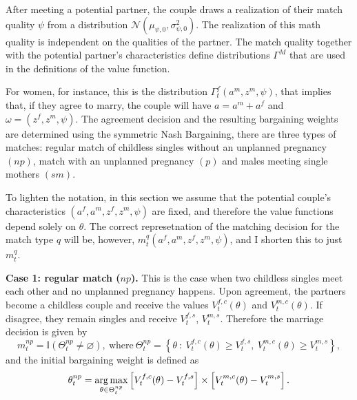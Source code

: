 \documentclass[12pt,letter]{article}
\DeclareMathOperator*{\argmax}{\mathrm{arg\,max}}
\newcommand{\I}{\mathbb{I}}
\begin{document}
After meeting a potential partner, the couple draws a realization of their match quality $\psi$ from a distribution $\mathcal{N}(\mu_{\psi,0},\sigma^2_{\psi,0})$.  The realization of this math quality is independent on the qualities of the partner. The match quality together with the potential partner's characteristics define distributions $\Gamma^M$ that are used in the definitions of the value function. 

For women, for instance, this is the distribution $\Gamma^f_t(a^m,z^m,\psi)$, that implies that, if they agree to marry, the couple will have $a = a^m + a^f$ and $\omega = (z^f,z^m,\psi)$. The agreement decision and the resulting bargaining weights are determined using the symmetric Nash Bargaining, there are three types of matches: regular match of childless singles without an unplanned pregnancy $(np)$, match with an unplanned pregnancy $(p)$ and males meeting single mothers $(sm)$. 

To lighten the notation, in this section we assume that the potential couple's characteristics $(a^f,a^m,z^f,z^m,\psi)$ are fixed, and therefore the value functions depend solely on $\theta$. The correct represetnation of the matching decision for the match type $q$ will be, however, $m_t^q(a^f,a^m,z^f,z^m,\psi)$, and I shorten this to just $m^q_t$.

\textbf{Case 1: regular match ($np$).} This is the case when two childless singles meet each other and no unplanned pregnancy happens. Upon agreement, the partners become a childless couple and receive the values $V_t^{f,c}(\theta)$ and $V_t^{m,c}(\theta)$. If disagree, they remain singles and receive $V_t^{f,s}$, $V_t^{m,s}$. Therefore the marriage decision is given by
\[m^{np}_t = \I(\Theta^{np}_t \neq \varnothing), \ \text{where} \ \Theta^{np}_t = \left\{ \theta \ : \ V_t^{f,c}(\theta) \geq V_t^{f,s}, \ V_t^{m,c}(\theta) \geq V_t^{m,s} \right\},\]
and the initial bargaining weight is defined as
\begin{equation}\label{bargaining-problem-regular}\theta^{np}_t = \argmax\limits_{\theta\in \Theta^{np}_t} \left[ V_t^{f,c}(\theta) - V_t^{f,s} \right] \times \left[ \vphantom{ V_t^{f,c}(\theta)}V_t^{m,c}(\theta) - V_t^{m,s} \right].\end{equation}
\end{document}
